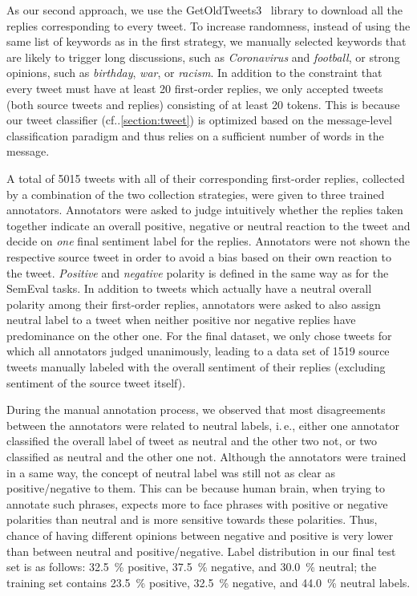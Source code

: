 \documentclass[conference]{IEEEtran}
\makeatletter
\DeclareRobustCommand\onedot{\futurelet\@let@token\@onedot}
\def\@onedot{\ifx\@let@token.\else.\null\fi\xspace}
\newcommand{\cf}{cf\onedot}
\newcommand{\ie}{i.\,e.,\xspace}
\makeatother
\begin{document}
As our second approach, we use the GetOldTweets3~\cite{GetOldTweets3} library to download all the replies corresponding to every tweet. To increase randomness, instead of using the same list of keywords as in the first strategy, we manually selected keywords that are likely to trigger long discussions, such as \emph{Coronavirus} and \emph{football}, or strong opinions, such as \emph{birthday}, \emph{war}, or \emph{racism}. In addition to the constraint that every tweet must have at least 20 first-order replies, 
we only accepted tweets (both source tweets and replies) consisting of at least 20 tokens. This is because our tweet classifier (\cf\cref{section:tweet}) is optimized based on the message-level classification paradigm and thus relies on a sufficient number of words in the message.

A total of \num{5015} tweets with all of their corresponding first-order replies, collected by a combination of the two collection strategies, were given to three trained annotators. 
Annotators were asked to judge intuitively whether the replies taken together indicate an overall positive, negative or neutral reaction to the tweet and decide on \emph{one} final sentiment label for the replies.
Annotators were not shown the respective source tweet in order to avoid a bias based on their own reaction to the tweet.
\emph{Positive} and \emph{negative} polarity is defined in the same way as for the SemEval tasks.
In addition to tweets which actually have a neutral overall polarity among their first-order replies, annotators were asked to also assign neutral label to a tweet when neither positive nor negative replies have predominance on the other one.
For the final dataset, we only chose tweets for which all annotators judged unanimously, leading to a data set of \num{1519} source tweets manually labeled with the overall sentiment of their replies (excluding sentiment of the source tweet itself). 

During the manual annotation process, we observed that most disagreements between the annotators were related to neutral labels, \ie either one annotator classified the overall label of tweet as neutral and the other two not, or two classified as neutral and the other one not. Although the annotators were trained in a same way, the concept of neutral label was still not as clear as positive/negative to them. This can be because human brain, when trying to annotate such phrases, expects more to face phrases with positive or negative polarities than neutral and is more sensitive towards these polarities. Thus, chance of having different opinions between negative and positive is very lower than between neutral and positive/negative.
Label distribution in our final test set is as follows: \SI{32.5}{\percent} positive, \SI{37.5}{\percent} negative, and \SI{30.0}{\percent} neutral; the training set contains \SI{23.5}{\percent} positive, \SI{32.5}{\percent} negative, and \SI{44.0}{\percent} neutral labels.
\end{document}
